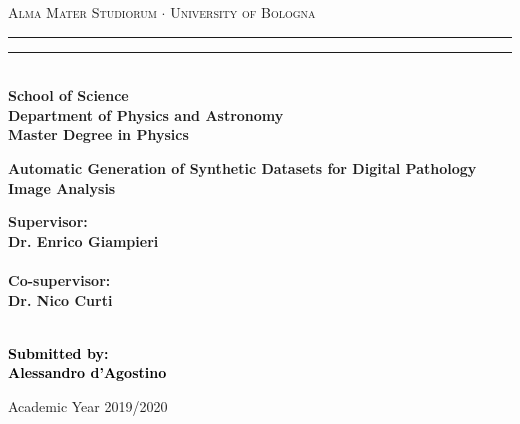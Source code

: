 \begin{titlepage}
    \begin{center}
        {{\Large{\textsc{Alma Mater Studiorum $\cdot$ University of  Bologna}}}}
        \rule[0.1cm]{15.8cm}{0.1mm}
        \rule[0.5cm]{15.8cm}{0.6mm}
        \\\vspace{3mm}
        {\small{\bf School of Science \\
        Department of Physics and Astronomy\\
        Master Degree in Physics}}
    \end{center}

    \vspace{23mm}

    \begin{center}
        \LARGE{\bf Automatic Generation of Synthetic Datasets for Digital Pathology Image Analysis}\\
    \end{center}

    \vspace{40mm} \par \noindent

    \begin{minipage}[t]{0.47\textwidth}
        {\large{\bf Supervisor: \vspace{2mm}\\
        Dr. Enrico Giampieri\\\\
        \bf Co-supervisor: \vspace{2mm}\\
        Dr. Nico Curti\\\\}}
    \end{minipage}

    \hfill
    \begin{minipage}[t]{0.47\textwidth}\raggedleft
        \textcolor{black}{
            {\large{\bf Submitted by:
                \vspace{2mm}\\
                {Alessandro d'Agostino}}}
        }
    \end{minipage}

    \vspace{21mm}

    \begin{center}
        Academic Year 2019/2020
    \end{center}
\end{titlepage}
